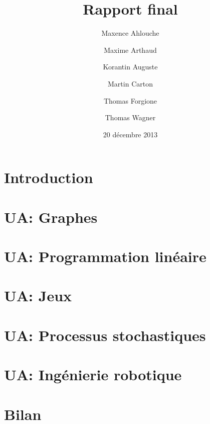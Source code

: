 \documentclass{scrartcl}
\title{Rapport final}
\author{Maxence Ahlouche \and Maxime Arthaud \and Korantin Auguste
  \and Martin Carton \and Thomas Forgione \and Thomas Wagner}
\date{20 décembre 2013}
\begin{document}
  
  \newpage
  \tableofcontents

  \newpage
  \section{Introduction}
    

  \newpage
  \section{UA: Graphes}
    

  \newpage
  \section{UA: Programmation linéaire}
    

  \newpage
  \section{UA: Jeux}
    

  \newpage
  \section{UA: Processus stochastiques}
    

  \newpage
  \section{UA: Ingénierie robotique}
    

  \newpage
  \section{Bilan}
    

  \newpage
  \begin{thebibliography}{99}
    
  \end{thebibliography}
\end{document}
